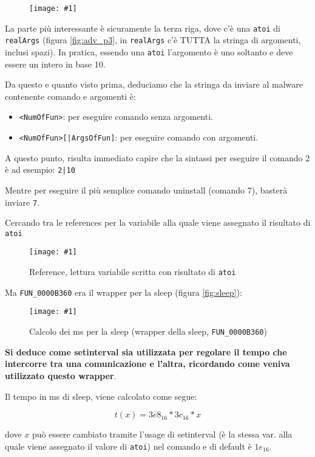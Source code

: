 \documentclass[
    a4paper, %
    11pt %
]{article}
\newcommand{\pic}[4]{\begin{figure}[H]
            \centering
            \texttt{[image: \#1]}
            \caption{#2}
            \label{fig:#1}
            \end{figure}}
\begin{document}
            \pic{adv_setinterval}{}{17cm}{4cm}

            La parte più interessante è sicuramente la terza riga, dove c'è una \texttt{atoi} di \texttt{realArgs} (figura \ref{fig:adv_p3}, in \texttt{realArgs} c'è TUTTA la stringa di argomenti, inclusi spazi). In pratica, essendo una \texttt{atoi} l'argomento
            è uno soltanto e deve essere un intero in base 10.

            Da questo e quanto visto prima, deduciamo che la stringa da inviare al malware contenente comando e
            argomenti è:

            \begin{itemize}
                \item \texttt{<NumOfFun>}: per eseguire comando senza argomenti.
                \item \texttt{<NumOfFun>[|ArgsOfFun]}: per eseguire comando con argomenti.
            \end{itemize}

            A questo punto, risulta immediato capire che la sintassi per eseguire il comando 2 è ad esempio:
            \texttt{2|10}

            Mentre per eseguire il più semplice comando uninstall (comando 7), basterà inviare \texttt{7}.

            Cercando tra le references per la variabile alla quale viene assegnato il risultato di \texttt{atoi}

            \pic{adv_sleeppush}{Reference, lettura variabile scritta con risultato di \texttt{atoi}}{10cm}{3cm}

            Ma \texttt{FUN\_0000B360} era il wrapper per la sleep (figura \ref{fig:sleep}):

            \pic{adv_sleepwrap}{Calcolo dei ms per la sleep (wrapper della sleep, \texttt{FUN\_0000B360})}{12cm}{4cm}

            \textbf{Si deduce come setinterval sia utilizzata per regolare il tempo che intercorre tra una 
            comunicazione e l'altra, ricordando come veniva utilizzato questo wrapper}.

            Il tempo in ms di sleep, viene calcolato come segue:

            \begin{equation}
t(x) = 3e8_{16} * 3c_{16} * x
            \end{equation}

            dove $x$ può essere cambiato tramite l'usage di setinterval (è la stessa var. alla quale viene assegnato il valore di \texttt{atoi}) nel comando e di default è $1e_{16}$.
\end{document}
